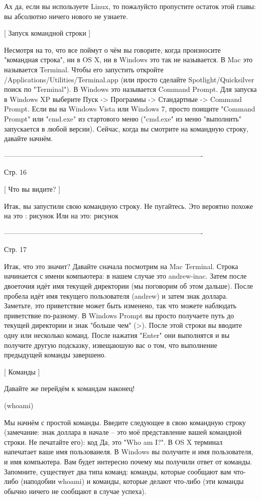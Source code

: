 Ах да, если вы используете Linux, то пожалуйсто пропустите остаток этой главы: вы
абсолютно ничего нового не узнаете.

[ Запуск командной строки ]

Несмотря на то, что все поймут о чём вы говорите, когда произносите "командная 
строка", ни в OS X, ни в Windows это так не называется. В Mac это называется 
Terminal. Чтобы его запустить откройте /Applications/Utilities/Terminal.app (или 
просто сделайте Spotlight/Quicksilver поиск по "Terminal").
В Windows это называется Command Prompt. Для запуска в Windows XP выберите Пуск -> 
Программы -> Стандартные -> Command Prompt. Если вы на Windows Vista или Windows 7,
просто поищите "Command Prompt" или "cmd.exe" из стартового меню ("cmd.exe" из меню
"выполнить" запускается в любой версии).
Сейчас, когда вы смотрите на командную строку, давайте начнём.

-------------------------------------------------------------------------------------

Стр. 16

[ Что вы видите? ]

Итак, вы запустили свою командную строку. Не пугайтесь. Это вероятно похоже на это :
{рисунок}
Или на это:
{рисунок}

-------------------------------------------------------------------------------------

Стр. 17

Итак, что это значит? Давайте сначала посмотрим на Mac Terminal. Строка начинается с
имени компьютера: в нашем случае это andrew-inac. Затем после двоеточия идёт имя 
текущей директории (мы поговорим об этом дальше). После пробела идёт имя текущего
пользователя (andrew) и затем знак доллара. Заметьте, это приветствие может быть 
изменено, так что можете наблюдать приветствие по-разному.
В Windows Prompt вы просто получаете путь до текущей директории и знак "больше чем" (>).
После этой строки вы вводите одну или несколько команд. После нажатия "Enter" они 
выполнятся и вы получите другую подсказку, извещаюшую вас о том, что выполнение 
предыдущей команды завершено.

[ Команды ]

Давайте же перейдём к командам наконец!

(whoami)

Мы начнём с простой команды. Введите следующее в свою командную строку (замечание:
знак доллара в начале -- это моё представление вашей командной строки. Не печатайте
его):
{код}
Да, это "Who am I?". В OS X терминал напечатает ваше имя пользоваиеля. В Windows вы 
получите и имя пользователя, и имя компьютера.
Вам будет интересно почему мы получили ответ от команды. Запомните, существует два
типа команд: команды, которые сообщают вам что-либо (наподобии whoami) и команды,
которые делают что-либо (эти команды обычно ничего не сообщают в случае успеха).

